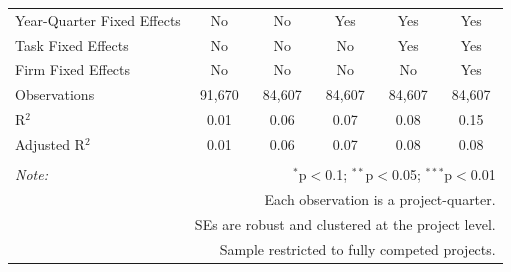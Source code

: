 \documentclass[
]{article}
\begin{document}
\begin{table}[H]
\begin{tabular}{@{\extracolsep{-2pt}}lccccc}
Year-Quarter Fixed Effects & No & No & Yes & Yes & Yes \\ 
Task Fixed Effects & No & No & No & Yes & Yes \\ 
Firm Fixed Effects & No & No & No & No & Yes \\ 
Observations & 91,670 & 84,607 & 84,607 & 84,607 & 84,607 \\ 
R$^{2}$ & 0.01 & 0.06 & 0.07 & 0.08 & 0.15 \\ 
Adjusted R$^{2}$ & 0.01 & 0.06 & 0.07 & 0.08 & 0.08 \\ 
\hline 
\hline \\[-1.8ex] 
\textit{Note:}  & \multicolumn{5}{r}{$^{*}$p$<$0.1; $^{**}$p$<$0.05; $^{***}$p$<$0.01} \\ 
 & \multicolumn{5}{r}{Each observation is a project-quarter.} \\ 
 & \multicolumn{5}{r}{SEs are robust and clustered at the project level.} \\ 
 & \multicolumn{5}{r}{Sample restricted to fully competed projects.} \\ 
\end{tabular} 
\end{table}
\end{document}
